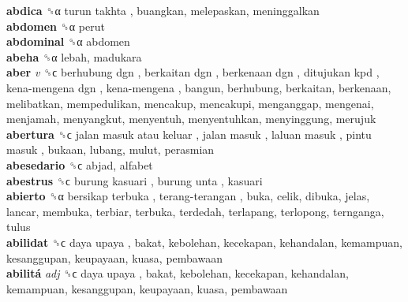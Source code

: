 \textbf{abdica} ␝α   turun takhta , buangkan, melepaskan, meninggalkan  \\
\textbf{abdomen} ␝α  perut  \\
\textbf{abdominal} ␝α  abdomen  \\
\textbf{abeha} ␝α  lebah, madukara  \\
\textbf{aber} \emph{v}  ␝ϲ   berhubung dgn ,  berkaitan dgn ,  berkenaan dgn ,  ditujukan kpd ,  kena-mengena dgn ,  kena-mengena , bangun, berhubung, berkaitan, berkenaan, melibatkan, mempedulikan, mencakup, mencakupi, menganggap, mengenai, menjamah, menyangkut, menyentuh, menyentuhkan, menyinggung, merujuk  \\
\textbf{abertura} ␝ϲ   jalan masuk atau keluar ,  jalan masuk ,  laluan masuk ,  pintu masuk , bukaan, lubang, mulut, perasmian  \\
\textbf{abesedario} ␝ϲ  abjad, alfabet  \\
\textbf{abestrus} ␝ϲ   burung kasuari ,  burung unta , kasuari  \\
\textbf{abierto} ␝α   bersikap terbuka ,  terang-terangan , buka, celik, dibuka, jelas, lancar, membuka, terbiar, terbuka, terdedah, terlapang, terlopong, ternganga, tulus  \\
\textbf{abilidat} ␝ϲ   daya upaya , bakat, kebolehan, kecekapan, kehandalan, kemampuan, kesanggupan, keupayaan, kuasa, pembawaan  \\
\textbf{abilitá} \emph{adj}  ␝ϲ   daya upaya , bakat, kebolehan, kecekapan, kehandalan, kemampuan, kesanggupan, keupayaan, kuasa, pembawaan  \\
